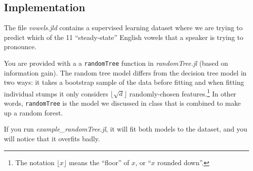 \documentclass{article}
\begin{document}
 
 \subsection{Implementation}
 
The file \emph{vowels.jld} contains a supervised learning dataset where we are trying to predict which of the 11 ``steady-state'' English vowels that a speaker is trying to pronounce.

You are provided with a a \texttt{randomTree} function in \emph{randomTree.jl} (based on information gain). The random tree model differs from the decision tree model in two ways: 
it takes a bootstrap sample of the data before fitting and when fitting individual stumps it only considers $\lfloor \sqrt{d} \rfloor$ randomly-chosen features.\footnote{The notation $\lfloor x\rfloor$ means the ``floor'' of $x$, or ``$x$ rounded down''.}  
In other words, \texttt{randomTree} is the model we discussed in class that is combined to make up a random forest.

If you run \emph{example\_randomTree.jl}, it will fit both models to the dataset, and you will notice that it overfits badly.
\end{document}
